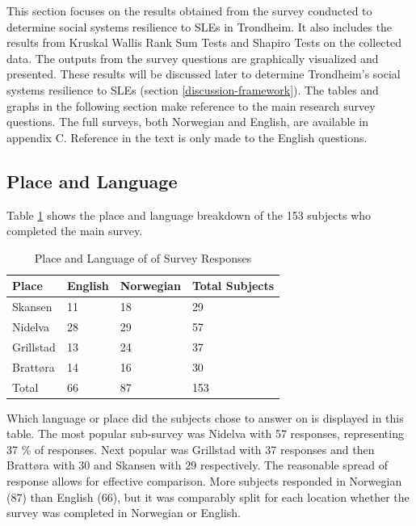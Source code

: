 This section focuses on the results obtained from the survey conducted to determine social systems resilience to SLEs in Trondheim.  It also includes the results from Kruskal Wallis Rank Sum Tests and Shapiro Tests on the collected data. The outputs from the survey questions are graphically visualized and presented. These results will be discussed later to determine Trondheim's social systems resilience to SLEs (section \ref{discussion-framework}). The tables and graphs in the following section make reference to the main research survey questions. The full surveys, both Norwegian and English, are available in appendix C. Reference in the text is only made to the English questions. 



\subsection{Place and Language}
Table \ref{tab:place_language} shows the place and language breakdown of the 153 subjects who completed the main survey. 
\begin{table}[H]
    \centering
    \begin{tabular}{|l|l|l|l|}
    \hline
    \textbf{Place}  & \textbf{ English} & \textbf{Norwegian} & \textbf{Total Subjects}  \\ \hline
      Skansen & 11 & 18  & 29    \\ \hline
      Nidelva & 28 & 29 & 57      \\ \hline
      Grillstad & 13 & 24 & 37       \\ \hline
      Brattøra & 14 & 16 & 30     \\ \hline
      Total & 66 & 87 & 153   \\ \hline
     \end{tabular}
    \caption{Place and Language of of Survey Responses}{ Which language or place did the subjects chose to answer on is displayed in this table. The most popular sub-survey was Nidelva with 57 responses, representing 37 \% of responses. Next popular was Grillstad with 37 responses and then Brattøra with 30 and Skansen with 29 respectively. The reasonable spread of response allows for effective comparison. More subjects responded in Norwegian (87) than English (66), but it was comparably split for each location whether the survey was completed in Norwegian or English. }
    \label{tab:place_language}
\end{table}
\paragraph{}

